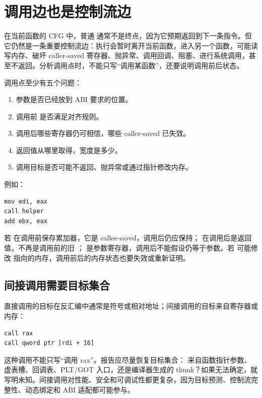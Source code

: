 \section{调用边也是控制流边}

在当前函数的 CFG 中，普通  通常不是终点，因为它预期返回到下一条指令。但它仍然是一条重要控制流边：执行会暂时离开当前函数，进入另一个函数，可能读写内存、破坏 caller-saved 寄存器、抛异常、调用回调、阻塞、进行系统调用，甚至不返回。分析调用点时，不能只写“调用某函数”，还要说明调用前后状态。

调用点至少有五个问题：

\begin{enumerate}
  \item 参数是否已经放到 ABI 要求的位置。
  \item 调用前  是否满足对齐规则。
  \item 调用后哪些寄存器仍可相信，哪些 caller-saved 已失效。
  \item 返回值从哪里取得，宽度是多少。
  \item 调用目标是否可能不返回、抛异常或通过指针修改内存。
\end{enumerate}

例如：

\begin{lstlisting}
mov edi, eax
call helper
add ebx, eax
\end{lstlisting}

若  在调用前保存累加器，它是 callee-saved，调用后仍应保持； 在调用后是返回值，不再是调用前的旧 ； 是参数寄存器，调用后不能假设仍等于参数。若  可能修改  指向的内存，调用前后的内存状态也要失效或重新证明。

\subsection{间接调用需要目标集合}

直接调用的目标在反汇编中通常是符号或相对地址；间接调用的目标来自寄存器或内存：

\begin{lstlisting}
call rax
call qword ptr [rdi + 16]
\end{lstlisting}

这种调用不能只写“调用 rax”。报告应尽量恢复目标集合： 来自函数指针参数、虚表槽、回调表、PLT/GOT 入口，还是编译器生成的 thunk？如果无法确定，就写明未知。间接调用对性能、安全和可调试性都更复杂，因为目标预测、控制流完整性、动态绑定和 ABI 适配都可能参与。

